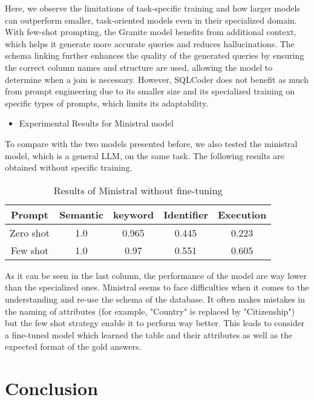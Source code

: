 \documentclass[12pt,a4paper]{article}
\begin{document}
Here, we observe the limitations of task-specific training and how larger models can outperform smaller, task-oriented models even in their specialized domain.
With few-shot prompting, the Granite model benefits from additional context, which helps it generate more accurate queries and reduces hallucinations. The schema linking further enhances the quality of the generated queries by ensuring the correct column names and structure are used, allowing the model to determine when a join is necessary.
However, SQLCoder does not benefit as much from prompt engineering due to its smaller size and its specialized training on specific types of prompts, which limits its adaptability.

\begin{itemize}
\item Experimental Results for Ministral model
\end{itemize}

To compare with the two models presented before, we also tested the ministral model, which is a general LLM, on the same task. The following results are obtained without specific training.

\begin{table}[h]
    \centering
    \begin{tabular}{|c|c|c|c|c|}
        \hline
         \textbf{Prompt}& \textbf{Semantic} & \textbf{keyword}&\textbf{Identifier}& \textbf{Execution}\\
         \hline
         Zero shot& 1.0&0.965&0.445&0.223 \\
         Few shot& 1.0&0.97&0.551&0.605\\
         \hline
    \end{tabular}
    \caption{Results of Ministral without fine-tuning}
    \label{tab:my_label}
\end{table}
As it can be seen in the last column, the performance of the model are way lower than the specialized ones. Ministral seems to face difficulties when it comes to the understanding and re-use the schema of the database. It often makes mistakes in the naming of attributes (for example, "Country" is replaced by "Citizenship") but the few shot strategy enable it to perform way better. This leads to consider a fine-tuned model which learned the table and their attributes as well as the expected format of the gold answers. 
\section*{Conclusion}
\end{document}
